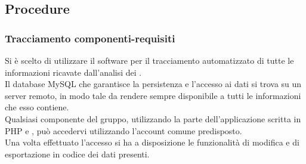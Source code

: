 \documentclass[NormeDiProgetto.tex]{subfiles}
\begin{document}






\subsection{Procedure}

\subsubsection{Tracciamento componenti-requisiti}
	Si è scelto di utilizzare il software  per il tracciamento automatizzato di tutte le informazioni ricavate dall'analisi dei .\\
	Il database MySQL che garantisce la persistenza e l'accesso ai dati si trova su un server remoto, in modo tale da rendere sempre disponibile a tutti le informazioni che esso contiene.\\
	Qualsiasi componente del gruppo, utilizzando la parte  dell'applicazione scritta in PHP e , può accedervi utilizzando l'account comune predisposto.\\
	Una volta effettuato l'accesso si ha a disposizione le funzionalità di modifica e di esportazione in codice  dei dati presenti.\\
	
	
\end{document}
